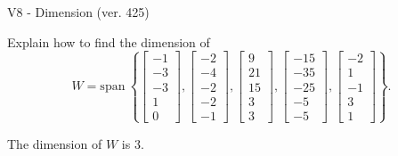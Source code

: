 \begin{exercise}
  \begin{exerciseTitle}V8 - Dimension (ver. 425)\end{exerciseTitle}
  \begin{exerciseStatement}
    Explain how to find the dimension of 
\[W=\mathrm{span}\ \left\{\left[\begin{array}{r}
-1 \\
-3 \\
-3 \\
1 \\
0
\end{array}\right] , \left[\begin{array}{r}
-2 \\
-4 \\
-2 \\
-2 \\
-1
\end{array}\right] , \left[\begin{array}{r}
9 \\
21 \\
15 \\
3 \\
3
\end{array}\right] , \left[\begin{array}{r}
-15 \\
-35 \\
-25 \\
-5 \\
-5
\end{array}\right] , \left[\begin{array}{r}
-2 \\
1 \\
-1 \\
3 \\
1
\end{array}\right]\right\}.\]



  \end{exerciseStatement}
  \begin{exerciseAnswer}
   The dimension of \(W\) is  \(3\).
  


  \end{exerciseAnswer}
\end{exercise}